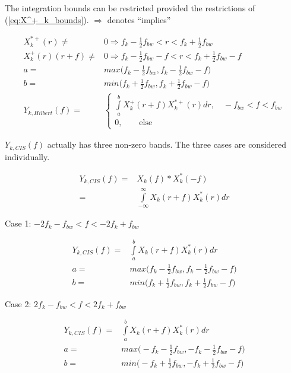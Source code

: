 \documentclass [11pt, proquest,oneside] {ganter_thesis}[2015/03/03]
\begin{document}
The integration bounds can be restricted provided the restrictions of (\ref{eq:X^+_k_bounds}).  $\Rightarrow$ denotes ``implies''

\begin{align}
X^{*+}_{k}(r) \neq& 0 \Rightarrow  f_k - \frac{1}{2} f_{bw} < r < f_k + \frac{1}{2} f_{bw} \\
%
X^{+}_{k}(r)(r + f) \neq& 0 \Rightarrow  f_k - \frac{1}{2} f_{bw} - f < r < f_k + \frac{1}{2} f_{bw} - f \\
%
a =& max\Big( f_k - \frac{1}{2} f_{bw},  f_k - \frac{1}{2} f_{bw} - f\Big) \\
b =& min\Big( f_k + \frac{1}{2} f_{bw},  f_k + \frac{1}{2} f_{bw} - f\Big) \\
%
\label{eq:cis_vs_hilbert_exactly_the_same}
Y_{k,Hilbert}(f) =&\left\{
                \begin{array}{ll}
                 \int\limits_{a}^{b} X^+_{k}(r + f) X^{*+}_{k}(r)dr, \quad -f_{bw} < f < f_{bw} \\
				0, \qquad \mathrm{else}
  \end{array}
              \right.
\end{align}

$Y_{k,CIS}(f)$ actually has three non-zero bands.  The three cases are considered individually.

\begin{align}
Y_{k,CIS}(f) =& X_{k}(f) * X_{k}^*(-f) \nonumber \\
=& \int\limits_{-\infty}^{\infty} X_{k}(r + f) X_{k}^*(r)dr
\end{align}

Case 1: $-2f_k - f_{bw} < f < -2f_k + f_{bw}$

\begin{align}
Y_{k,CIS}(f) =& \int\limits_{a}^{b} X_{k}(r + f) X_{k}^*(r)dr \\
%
a =& max\Big( f_k - \frac{1}{2} f_{bw},  f_k - \frac{1}{2} f_{bw} - f\Big) \\
b =& min\Big( f_k + \frac{1}{2} f_{bw},  f_k + \frac{1}{2} f_{bw} - f\Big)
\end{align}

Case 2: $2f_k - f_{bw} < f < 2f_k + f_{bw}$

\begin{align}
Y_{k,CIS}(f) =& \int\limits_{a}^{b} X_{k}(r + f) X_{k}^*(r)dr \\
%
a =& max\Big( -f_k - \frac{1}{2} f_{bw},  -f_k - \frac{1}{2} f_{bw} - f\Big) \\
b =& min\Big( -f_k + \frac{1}{2} f_{bw},  -f_k + \frac{1}{2} f_{bw} - f\Big)
\end{align}
\end{document}
